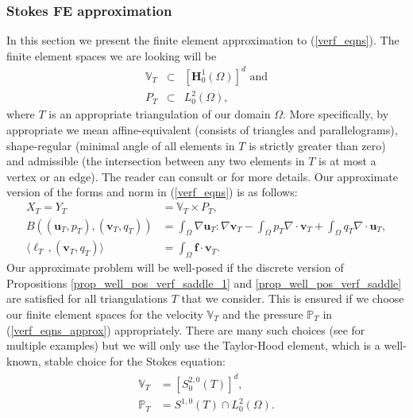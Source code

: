 \documentclass[12pt,a4paper]{article}
\theoremstyle{definition}
\begin{document}
\subsubsection{Stokes FE approximation}
In this section we present the finite element approximation to (\ref{verf_eqns}).  The finite element spaces we are looking will be
\begin{eqnarray}
	\mathbb{V}_T&\subset&\left[\textbf{H}^1_0\left(\Omega\right)\right]^d \text{ and}\nonumber\\
	P_T&\subset& L^2_0\left(\Omega\right),\nonumber
\end{eqnarray}
where $T$ is an appropriate triangulation of our domain $\Omega$.  More specifically, by appropriate we mean affine-equivalent (consists of triangles and parallelograms), shape-regular (minimal angle of all elements in $T$ is strictly greater than zero)  and admissible (the intersection between any two elements in $T$ is at most a vertex or an edge).  The reader can consult \cite{verfurth2013posteriori} or \cite{brenner2007mathematical} for more details.
Our approximate version of the forms and norm in (\ref{verf_eqns}) is  as follows:
\begin{equation}\label{verf_eqns_approx}
\begin{aligned}
X_T=Y_T&=\mathbb{V}_T\times P_T,\\
B\left(\left(\textbf{u}_T,p_T\right),\left(\textbf{v}_T,q_T\right)\right)&=\int_{\Omega}\nabla \textbf{u}_T : \nabla \textbf{v}_T - \int_{\Omega} p_T \nabla\cdot\textbf{v}_T + \int_{\Omega} q_T \nabla\cdot\textbf{u}_T,\\
\langle \ell_T\,,\left(\textbf{v}_T,q_T\right) \rangle &= \int_{\Omega}\textbf{f}\cdot \textbf{v}_T.
\end{aligned}
\end{equation}
Our approximate problem will be well-posed if the discrete version of Propositions \ref{prop_well_pos_verf_saddle_1} and \ref{prop_well_pos_verf_saddle} are satisfied for all triangulations $T$ that we consider.  This is ensured if we choose our finite element spaces for the velocity $\mathbb{V}_T$ and the pressure $\mathbb{P}_T$ in (\ref{verf_eqns_approx}) appropriately.
There are many such choices (see \cite[\S 4.10.2]{verfurth2013posteriori} for multiple examples) but we will only use the Taylor-Hood element, which is a well-known, stable choice for the Stokes equation:
\begin{eqnarray}
\begin{aligned}
\mathbb{V}_T&=\left[S^{2,0}_0\left(T\right)\right]^d,\\
\mathbb{P}_T&=S^{1,0}\left(T\right)\cap L^2_0\left(\Omega\right).
\end{aligned}
\end{eqnarray}
\end{document}
